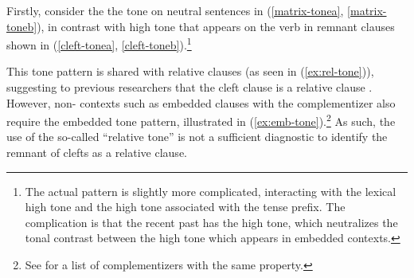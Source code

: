 \documentclass[12pt]{article}
\begin{document}
Firstly, consider the the tone on neutral sentences in (\ref{matrix-tonea}, \ref{matrix-toneb}), in contrast with high tone that appears on the verb in remnant clauses shown in (\ref{cleft-tonea}, \ref{cleft-toneb}).\footnote{The actual pattern is slightly more complicated, interacting with the lexical high tone and the high tone associated with the tense prefix. The complication is that the recent past has the high tone, which neutralizes the tonal contrast between the high tone which appears in embedded contexts.}

\bex
\ex {}\bxl
	 \label{matrix-tonea}
	 \label{cleft-tonea}
\fxl
\ex \bxl
	 \label{matrix-toneb}
	\label{cleft-toneb}
\fxl
\fex

This tone pattern is shared with relative clauses (as seen in (\ref{ex:rel-tone})), suggesting to previous researchers that the cleft clause is a relative clause \citep{ndayiragije-1999,lafkioui-et-al-2016}. However, non-\abar{} contexts such as embedded clauses  with the complementizer  also require the embedded tone pattern, illustrated in (\ref{ex:emb-tone}).\footnote{See \citealt[p. 325]{zorc-nibagwire-2007} for a list of complementizers with the same property.} As such, the use of the so-called ``relative tone'' is not a sufficient diagnostic to identify the remnant of clefts as a relative clause. 

\bex
\ex {}\bxl
{} \label{ex:rel-tone}
 \label{ex:emb-tone}
\fxl
\fex
\end{document}
